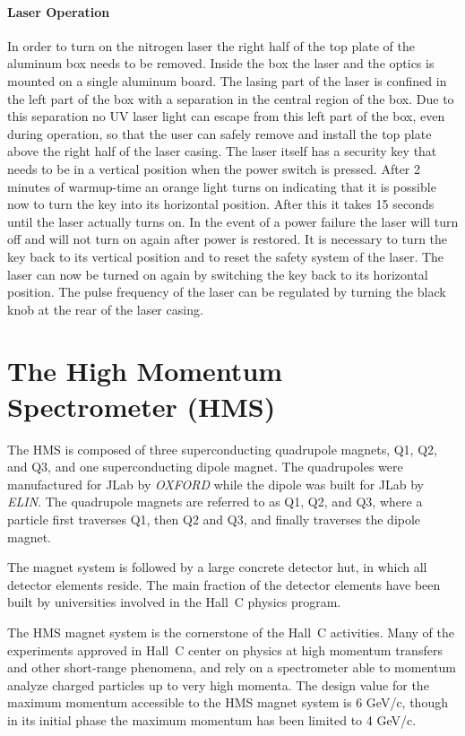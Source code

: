 \paragraph{Laser Operation} 
In order to turn on the nitrogen laser the right half of the top
plate of the aluminum box needs to be removed. Inside the box 
the laser and the optics is mounted on a single aluminum board.
The lasing part of the laser is confined in the left part of the box
with a separation in the central region of the box. Due to this separation
no UV laser light can escape from this left part of the box,
even during operation, so that the user can safely remove and install the
top plate above the right half of the laser casing.
The laser itself has a security key that needs 
to be in a vertical position when the power switch is pressed. After
2 minutes of warmup-time an orange light turns on indicating that
it is possible now to turn the key into its horizontal position.
After this it takes 15 seconds until the laser actually turns on.
In the event of a power failure the laser will turn off and will not
turn on again after power is restored. It is necessary to turn the key
back to its vertical position and to reset the safety system of the laser.
The laser can now be turned on again by switching the key back to its
horizontal position. The pulse frequency of the laser can be regulated by
turning the black knob at the rear of the laser casing.




\section{The High Momentum Spectrometer (HMS) }

The HMS is composed of three superconducting quadrupole magnets,
Q1, Q2, and Q3, and one superconducting dipole magnet. The quadrupoles
were manufactured for JLab by {\em OXFORD} while the dipole was built for 
JLab by {\em ELIN}.
The quadrupole magnets are referred to as Q1, Q2, and Q3, where a particle first traverses 
Q1, then Q2 and Q3, and finally traverses the dipole magnet.

The magnet system is followed by a large concrete detector hut, in which all
detector elements reside. The main fraction of the detector elements have been
built by universities involved in the Hall~C physics program.

The HMS magnet system is the cornerstone of the Hall~C activities.
Many of the experiments approved in Hall~C center on physics at high
momentum transfers and other short-range phenomena, and rely on a spectrometer
able to momentum analyze charged particles up to very high momenta.
The design value for the maximum momentum accessible to the HMS magnet
system is 6 GeV/c, though in its initial phase the maximum momentum
has been limited to 4 GeV/c.


